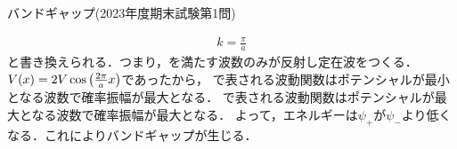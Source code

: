 \documentclass{report}
\begin{document}
\begin{myex}{バンドギャップ(2023年度期末試験第1問)}{}
\begin{enumerate}
\begin{align}
          k = \frac{\pi}{a}\label{1d-bragg-k-condition}
        \end{align}
        と書き換えられる．つまり，を満たす波数のみが反射し定在波をつくる．$V(x) = 2V\cos\qty(\frac{2\pi}{a}x)$であったから，
        で表される波動関数はポテンシャルが最小となる波数で確率振幅が最大となる．
        で表される波動関数はポテンシャルが最大となる波数で確率振幅が最大となる．
        よって，エネルギーは$\psi_+$が$\psi_-$より低くなる．これによりバンドギャップが生じる．
    \end{enumerate}
  \end{myex}
\end{document}
